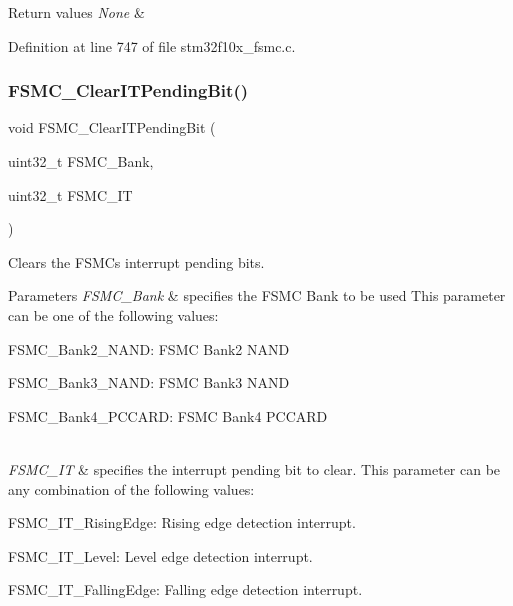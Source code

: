 \begin{DoxyRetVals}{Return values}
{\em None} & \\
\hline
\end{DoxyRetVals}


Definition at line 747 of file stm32f10x\+\_\+fsmc.\+c.

\mbox{\label{group___f_s_m_c___private___functions_gad9387e7674b8a376256a3378649e004e}} 
\subsubsection{\texorpdfstring{F\+S\+M\+C\+\_\+\+Clear\+I\+T\+Pending\+Bit()}{FSMC\_ClearITPendingBit()}}
{\footnotesize\ttfamily void F\+S\+M\+C\+\_\+\+Clear\+I\+T\+Pending\+Bit (\begin{DoxyParamCaption}\item[{uint32\+\_\+t}]{F\+S\+M\+C\+\_\+\+Bank,  }\item[{uint32\+\_\+t}]{F\+S\+M\+C\+\_\+\+IT }\end{DoxyParamCaption})}



Clears the F\+S\+MC\textquotesingle{}s interrupt pending bits. 


\begin{DoxyParams}{Parameters}
{\em F\+S\+M\+C\+\_\+\+Bank} & specifies the F\+S\+MC Bank to be used This parameter can be one of the following values\+: \begin{DoxyItemize}
\item F\+S\+M\+C\+\_\+\+Bank2\+\_\+\+N\+A\+ND\+: F\+S\+MC Bank2 N\+A\+ND \item F\+S\+M\+C\+\_\+\+Bank3\+\_\+\+N\+A\+ND\+: F\+S\+MC Bank3 N\+A\+ND \item F\+S\+M\+C\+\_\+\+Bank4\+\_\+\+P\+C\+C\+A\+RD\+: F\+S\+MC Bank4 P\+C\+C\+A\+RD \end{DoxyItemize}
\\
\hline
{\em F\+S\+M\+C\+\_\+\+IT} & specifies the interrupt pending bit to clear. This parameter can be any combination of the following values\+: \begin{DoxyItemize}
\item F\+S\+M\+C\+\_\+\+I\+T\+\_\+\+Rising\+Edge\+: Rising edge detection interrupt. \item F\+S\+M\+C\+\_\+\+I\+T\+\_\+\+Level\+: Level edge detection interrupt. \item F\+S\+M\+C\+\_\+\+I\+T\+\_\+\+Falling\+Edge\+: Falling edge detection interrupt. \end{DoxyItemize}
\\
\hline
\end{DoxyParams}

